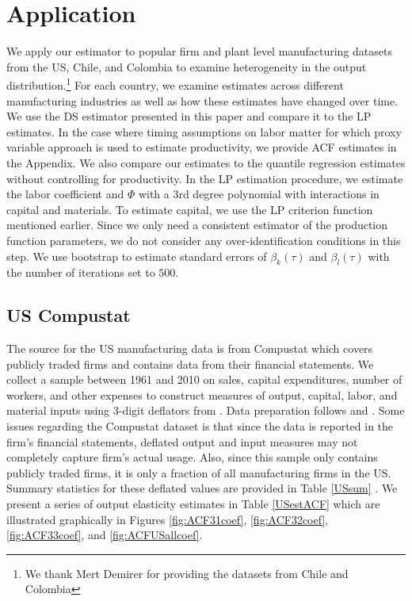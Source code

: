 \documentclass[11pt]{article}
\begin{document}
\section{Application} \label{application}
We apply our estimator to popular firm and plant level manufacturing datasets from the US, Chile, and Colombia to examine heterogeneity in the output distribution.\footnote{We thank Mert Demirer for providing the datasets from Chile and Colombia} For each country, we examine estimates across different manufacturing industries as well as how these estimates have changed over time. We use the DS estimator presented in this paper and compare it to the LP estimates. In the case where timing assumptions on labor matter for which proxy variable approach is used to estimate productivity, we provide ACF estimates in the Appendix. We also compare our estimates to the quantile regression estimates without controlling for productivity. In the LP estimation procedure, we estimate the labor coefficient and $\Phi$ with a 3rd degree polynomial with interactions in capital and materials. To estimate capital, we use the LP criterion function mentioned earlier. Since we only need a consistent estimator of the production function parameters, we do not consider any over-identification conditions in this step. We use bootstrap to estimate standard errors of $\beta_{k}(\tau)$ and $\beta_{l}(\tau)$ with the number of iterations set to $500$.
\subsection{US Compustat}
The source for the US manufacturing data is from Compustat which covers publicly traded firms and contains data from their financial statements. We collect a sample between 1961 and 2010 on sales, capital expenditures, number of workers, and other expenses to construct measures of output, capital, labor, and material inputs using 3-digit deflators from \cite{nber}. Data preparation follows \cite{Keller2009} and \cite{mert}. Some issues regarding the Compustat dataset is that since the data is reported in the firm's financial statements, deflated output and input measures may not completely capture firm's actual usage. Also, since this sample only contains publicly traded firms, it is only a fraction of all manufacturing firms in the US. Summary statistics for these deflated values are provided in Table \ref{USsum} . We present a series of output elasticity estimates in Table \ref{USestACF} which are illustrated graphically in Figures \ref{fig:ACF31coef}, \ref{fig:ACF32coef}, \ref{fig:ACF33coef}, and \ref{fig:ACFUSallcoef}.
\end{document}
